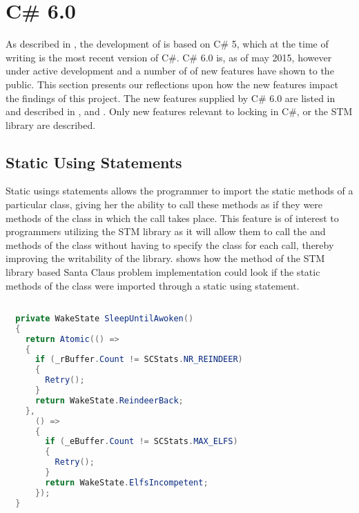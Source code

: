 \section{C\# 6.0}\label{sec:reflection_csharpsix}
As described in , the development of \stmname is based on C\# 5, which at the time of writing is the most recent version of C\#. C\# 6.0 is, as of may 2015, however under active development and a number of of new features have shown to the public. This section presents our reflections upon how the new features impact the findings of this project. The new features supplied by C\# 6.0 are listed in \cite{csharp6Features} and described in \cite{csharp6one}, \cite{csharp6two} and \cite{csharp6featureDescription}. Only new features relevant to locking in C\#, \stmname or the \ac{STM} library are described. 

\subsection{Static Using Statements}
Static usings statements allows the programmer to import the static methods of a particular class, giving her the ability to call these methods as if they were methods of the class in which the call takes place\cite{csharp6one}\cite{csharp6featureDescription}. This feature is of interest to programmers utilizing the \ac{STM} library as it will allow them to call the  and  methods of the  class without having to specify the class for each call, thereby improving the writability of the library.  shows how the  method of the \ac{STM} library based Santa Claus problem implementation could look if the static methods of the  class were imported through a static using statement.

\begin{lstlisting}[float,label=lst:static_using_example,
  caption={\ac{STM} library with static using statement},
  language=Java,  
  showspaces=false,
  showtabs=false,
  breaklines=true,
  showstringspaces=false,
  breakatwhitespace=true,
  escapechar=~,
  commentstyle=\color{greencomments},
  keywordstyle=\color{bluekeywords},
  stringstyle=\color{redstrings},
  morekeywords={atomic, retry, orelse, var, get, set, ref, out}]  % Start your code-block

  private WakeState SleepUntilAwoken()
  {
    return Atomic(() =>
    {
      if (_rBuffer.Count != SCStats.NR_REINDEER)
      {
        Retry();
      }
      return WakeState.ReindeerBack;
    },
      () =>
      {
        if (_eBuffer.Count != SCStats.MAX_ELFS)
        {
          Retry();
        }
        return WakeState.ElfsIncompetent;
      });
  }
\end{lstlisting}

